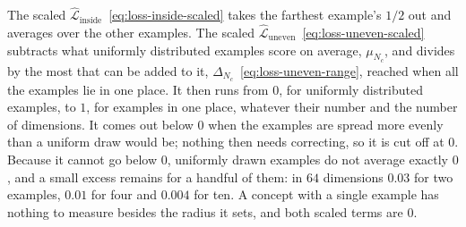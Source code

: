 \documentclass[11pt]{article}
\theoremstyle{remark}
\begin{document}
The scaled $\hat{\mathcal{L}}_{\mathrm{inside}}$~\eqref{eq:loss-inside-scaled} takes the farthest example's $1/2$ out and averages over the other examples. The scaled $\hat{\mathcal{L}}_{\mathrm{uneven}}$~\eqref{eq:loss-uneven-scaled} subtracts what uniformly distributed examples score on average, $\mu_{N_c}$, and divides by the most that can be added to it, $\Delta_{N_c}$~\eqref{eq:loss-uneven-range}, reached when all the examples lie in one place. It then runs from $0$, for uniformly distributed examples, to $1$, for examples in one place, whatever their number and the number of dimensions. It comes out below $0$ when the examples are spread more evenly than a uniform draw would be; nothing then needs correcting, so it is cut off at $0$. Because it cannot go below $0$, uniformly drawn examples do not average exactly $0$, and a small excess remains for a handful of them: in $64$ dimensions $0.03$ for two examples, $0.01$ for four and $0.004$ for ten. A concept with a single example has nothing to measure besides the radius it sets, and both scaled terms are $0$.
\end{document}
